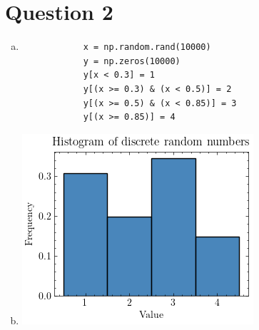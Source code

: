 \documentclass{article}
\begin{document}
\section*{Question 2}
\begin{enumerate}[(a)]
    \item 
        \begin{verbatim}
            x = np.random.rand(10000)
            y = np.zeros(10000)
            y[x < 0.3] = 1
            y[(x >= 0.3) & (x < 0.5)] = 2
            y[(x >= 0.5) & (x < 0.85)] = 3
            y[(x >= 0.85)] = 4
        \end{verbatim}

    \item
        \includegraphics[scale=0.7]{imgs/discrete.png}  \\
\end{enumerate}
\end{document}
